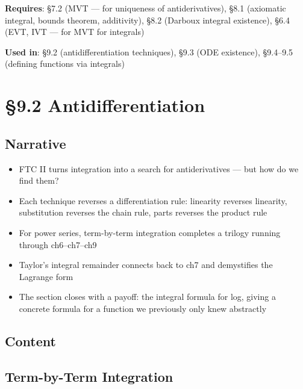 \documentclass[
  10pt,
  letterpaper,
]{scrbook}
\providecommand{\tightlist}{%
  \setlength{\itemsep}{0pt}\setlength{\parskip}{0pt}}
\begin{document}
\textbf{Requires}: §7.2 (MVT --- for uniqueness of antiderivatives),
§8.1 (axiomatic integral, bounds theorem, additivity), §8.2 (Darboux
integral existence), §6.4 (EVT, IVT --- for MVT for integrals)

\textbf{Used in}: §9.2 (antidifferentiation techniques), §9.3 (ODE
existence), §9.4--9.5 (defining functions via integrals)

\section{§9.2 Antidifferentiation}\label{antidifferentiation}

\subsection{Narrative}\label{narrative-39}

\begin{itemize}
\tightlist
\item
  FTC II turns integration into a search for antiderivatives --- but how
  do we find them?
\item
  Each technique reverses a differentiation rule: linearity reverses
  linearity, substitution reverses the chain rule, parts reverses the
  product rule
\item
  For power series, term-by-term integration completes a trilogy running
  through ch6--ch7--ch9
\item
  Taylor's integral remainder connects back to ch7 and demystifies the
  Lagrange form
\item
  The section closes with a payoff: the integral formula for log, giving
  a concrete formula for a function we previously only knew abstractly
\end{itemize}

\subsection{Content}\label{content-39}

\subsection{Term-by-Term Integration}\label{term-by-term-integration}
\end{document}
